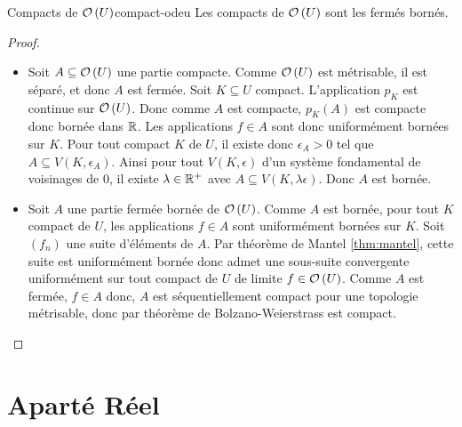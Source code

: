 \documentclass{cours}
\begin{document}
\begin{théorème}{Compacts de $\mathcal{O}\left(U\right)$}{compact-odeu}
    Les compacts de $\mathcal{O}\left(U\right)$ sont les fermés bornés.
\end{théorème}
\begin{proof}
    \begin{itemize}
        \item Soit $A \subseteq \mathcal{O}\left(U\right)$ une partie compacte. 
        Comme $\mathcal{O}\left(U\right)$ est métrisable, il est séparé, et donc $A$ est fermée. 
        Soit $K \subseteq U$ compact. 
        L'application $p_{K}$ est continue sur $\mathcal{O}\left(U\right)$. Donc comme $A$ est compacte, $p_{K}\left(A\right)$ est compacte donc bornée dans $\mathbb{R}$. 
        Les applications $f\in A$ sont donc uniformément bornées sur $K$. 
        Pour tout compact $K$ de $U$, il existe donc $\epsilon_{A} > 0$ tel que $A \subseteq V\left(K, \epsilon_{A}\right)$. 
        Ainsi pour tout $V\left(K, \epsilon\right)$ d'un système fondamental de voisinages de $0$, il existe $\lambda \in \mathbb{R}^{+}$ avec $A \subseteq V\left(K, \lambda \epsilon\right)$.
        Donc $A$ est bornée.
        \item Soit $A$ une partie fermée bornée de $\mathcal{O}\left(U\right)$. 
        Comme $A$ est bornée, pour tout $K$ compact de $U$, les applications $f \in A$ sont uniformément bornées sur $K$. Soit $\left(f_{n}\right)$ une suite d'éléments de $A$. 
        Par théorème de Mantel \ref{thm:mantel}, cette suite est uniformément bornée donc admet une sous-suite convergente uniformément sur tout compact de $U$ de limite $f \in \mathcal{O}\left(U\right)$.
        Comme $A$ est fermée, $f \in A$ donc, $A$ est séquentiellement compact pour une topologie métrisable, donc par théorème de Bolzano-Weierstrass est compact. 
    \end{itemize}
\end{proof}

\section{Aparté Réel}
\end{document}
